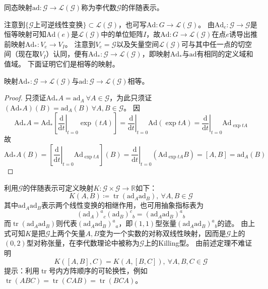 \begin{definition}
    同态映射$\mathrm{ad} \colon \mathscr{G} \to \mathscr{L}(\mathscr{G})$称为李代数$\mathscr{G}$的伴随表示。
\end{definition}

注意到$\{\mathscr{G}\text{上可逆线性变换}\} \subset \mathscr{L}(\mathscr{G})$，也可写$\mathrm{Ad} \colon G \to \mathscr{L}(\mathscr{G})$。
由$\mathrm{Ad}_e \colon \mathscr{G} \to \mathscr{G}$是恒等映射可知$\mathrm{Ad}(e)$是$\mathscr{L}(\mathscr{G})$中的单位矩阵$I$，故$\mathrm{Ad} \colon G \to \mathscr{L}(\mathscr{G})$在点$e$诱导出推前映射$\mathrm{Ad}_* \colon V_e \to V_I$。
注意到$V_e = \mathscr{G}$以及矢量空间$\mathscr{L}(\mathscr{G})$可与其中任一点的切空间（现在取$V_I$）认同，便有$\mathrm{Ad}_* \colon \mathscr{G} \to \mathscr{L}(\mathscr{G})$，即映射$\mathrm{Ad}_*$与$\mathrm{ad}$有相同的定义域和值域。
下面证明它们是相等的映射。

\begin{theorem}
    映射$\mathrm{Ad}_* \colon \mathscr{G} \to \mathscr{L}(\mathscr{G})$与$\mathrm{ad} \colon \mathscr{G} \to \mathscr{L}(\mathscr{G})$相等。
\end{theorem}

\begin{proof}
    只须证$\mathrm{Ad}_*A = \mathrm{ad}_A ~ \forall A \in \mathscr{G}$，为此只须证$(\mathrm{Ad}_*A)(B) = \mathrm{ad}_A(B) ~ \forall A, B \in \mathscr{G}$。
    因$$\mathrm{Ad}_*A = \mathrm{Ad}_*[\left.\frac{\mathrm{d}}{\mathrm{d}t}\right|_{t = 0}\exp(tA)] = \left.\frac{\mathrm{d}}{\mathrm{d}t}\right|_{t = 0}\mathrm{Ad}(\exp tA) = \left.\frac{\mathrm{d}}{\mathrm{d}t}\right|_{t = 0}\mathrm{Ad}_{\exp tA}$$
    故$$\mathrm{Ad}_*A(B) = [\left.\frac{\mathrm{d}}{\mathrm{d}t}\right|_{t = 0}\mathrm{Ad}_{\exp tA}](B) = \left.\frac{\mathrm{d}}{\mathrm{d}t}\right|_{t = 0}(\mathrm{Ad}_{\exp tA}B) = [A, B] = \mathrm{ad}_A(B)$$
\end{proof}

利用$\mathscr{G}$的伴随表示可定义映射$K \colon \mathscr{G} \times \mathscr{G} \to \mathbb{R}$如下：
$$K(A, B) \coloneq \operatorname{tr}(\mathrm{ad}_A\mathrm{ad}_B), ~ \forall A, B \in \mathscr{G}$$
其中$\mathrm{ad}_A\mathrm{ad}_B$表示两个线性变换的相继作用，也可用抽象指标表为
$$(\mathrm{ad}_A)^a{}_c(\mathrm{ad}_B)^c{}_b = (\mathrm{ad}_A\mathrm{ad}_B)^a{}_b$$
而$\operatorname{tr}(\mathrm{ad}_A\mathrm{ad}_B)$则代表$(\mathrm{ad}_A\mathrm{ad}_B)^a{}_a$，即$(1, 1)$型张量$(\mathrm{ad}_A\mathrm{ad}_B)^a{}_b$的迹。
由上式可知$K$是把$\mathscr{G}$上两个矢量$A, B$变为一个实数的对称双线性映射，因而是$\mathscr{G}$上的$(0, 2)$型对称张量，在李代数理论中被称为$\mathscr{G}$上的Killing型。
由前述定理不难证明
$$K([A, B], C) = K(A, [B, C]), ~ \forall A, B, C \in \mathscr{G}$$
提示：利用$\operatorname{tr}$号内方阵顺序的可轮换性，例如$\operatorname{tr}(ABC) = \operatorname{tr}(CAB) = \operatorname{tr}(BCA)$。

